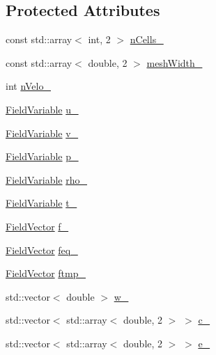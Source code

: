 \subsection*{Protected Attributes}
\begin{DoxyCompactItemize}
\item 
const std\+::array$<$ int, 2 $>$ \mbox{\hyperlink{classStaggeredGrid_acacffb5739539d9015c986080bb5ed44}{n\+Cells\+\_\+}}
\item 
const std\+::array$<$ double, 2 $>$ \mbox{\hyperlink{classStaggeredGrid_a9603c3334440aab082dda48947e5ce6e}{mesh\+Width\+\_\+}}
\item 
int \mbox{\hyperlink{classStaggeredGrid_a98c37d413d6633432bf7eca8d26b03b3}{n\+Velo\+\_\+}}
\item 
\mbox{\hyperlink{classFieldVariable}{Field\+Variable}} \mbox{\hyperlink{classStaggeredGrid_adcef36b4ce8cc6843a2b6f603b62c763}{u\+\_\+}}
\item 
\mbox{\hyperlink{classFieldVariable}{Field\+Variable}} \mbox{\hyperlink{classStaggeredGrid_a20ec43568fe937b194561e21a0b84ad9}{v\+\_\+}}
\item 
\mbox{\hyperlink{classFieldVariable}{Field\+Variable}} \mbox{\hyperlink{classStaggeredGrid_a2ea3c93dd401ac06461ade9a74e76459}{p\+\_\+}}
\item 
\mbox{\hyperlink{classFieldVariable}{Field\+Variable}} \mbox{\hyperlink{classStaggeredGrid_ab0567bc9d5eebc252814c72cbcb46e43}{rho\+\_\+}}
\item 
\mbox{\hyperlink{classFieldVariable}{Field\+Variable}} \mbox{\hyperlink{classStaggeredGrid_a06b3931e80b76e4041fb9218acbbb1c5}{t\+\_\+}}
\item 
\mbox{\hyperlink{classFieldVector}{Field\+Vector}} \mbox{\hyperlink{classStaggeredGrid_a025c007e37c470881d08947dfa312008}{f\+\_\+}}
\item 
\mbox{\hyperlink{classFieldVector}{Field\+Vector}} \mbox{\hyperlink{classStaggeredGrid_a575e1c6d6a60776ce0bc8d3cf47db43b}{feq\+\_\+}}
\item 
\mbox{\hyperlink{classFieldVector}{Field\+Vector}} \mbox{\hyperlink{classStaggeredGrid_a88163ce524495c545c4883c59ab9bc0c}{ftmp\+\_\+}}
\item 
std\+::vector$<$ double $>$ \mbox{\hyperlink{classStaggeredGrid_a4c8f5be0e5eb034f27073575cde1b2b4}{w\+\_\+}}
\item 
std\+::vector$<$ std\+::array$<$ double, 2 $>$ $>$ \mbox{\hyperlink{classStaggeredGrid_a80ad23c7cd78a2d032e3c42c5f63a793}{c\+\_\+}}
\item 
std\+::vector$<$ std\+::array$<$ double, 2 $>$ $>$ \mbox{\hyperlink{classStaggeredGrid_ae47c17d79b71fc451ed4b7ec1aaae0c2}{e\+\_\+}}
\end{DoxyCompactItemize}


